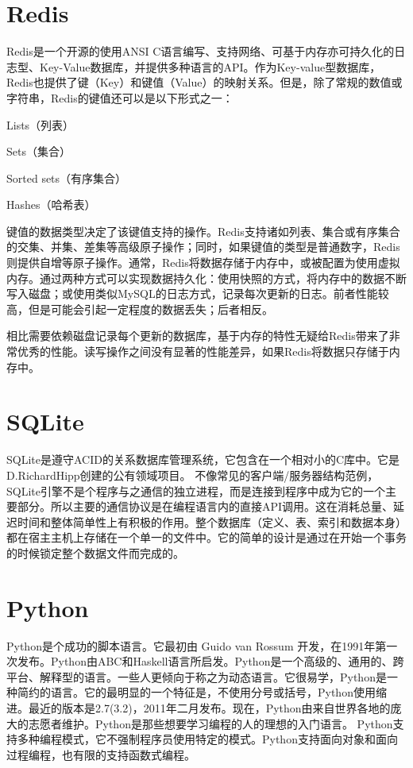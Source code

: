\documentclass{zjutthesis}
\begin{document}
\section{Redis}
Redis是一个开源的使用ANSI C语言编写、支持网络、可基于内存亦可持久化的日志型、Key-Value数据库，并提供多种语言的API。作为Key-value型数据库，Redis也提供了键（Key）和键值（Value）的映射关系。但是，除了常规的数值或字符串，Redis的键值还可以是以下形式之一：

Lists（列表）

Sets（集合）

Sorted sets（有序集合）

Hashes（哈希表）

键值的数据类型决定了该键值支持的操作。Redis支持诸如列表、集合或有序集合的交集、并集、差集等高级原子操作；同时，如果键值的类型是普通数字，Redis则提供自增等原子操作。通常，Redis将数据存储于内存中，或被配置为使用虚拟内存。通过两种方式可以实现数据持久化：使用快照的方式，将内存中的数据不断写入磁盘；或使用类似MySQL的日志方式，记录每次更新的日志。前者性能较高，但是可能会引起一定程度的数据丢失；后者相反。

相比需要依赖磁盘记录每个更新的数据库，基于内存的特性无疑给Redis带来了非常优秀的性能。读写操作之间没有显著的性能差异，如果Redis将数据只存储于内存中。


\section{SQLite}
SQLite是遵守ACID的关系数据库管理系统，它包含在一个相对小的C库中。它是D.RichardHipp创建的公有领域项目。
不像常见的客户端/服务器结构范例，SQLite引擎不是个程序与之通信的独立进程，而是连接到程序中成为它的一个主要部分。所以主要的通信协议是在编程语言内的直接API调用。这在消耗总量、延迟时间和整体简单性上有积极的作用。整个数据库（定义、表、索引和数据本身）都在宿主主机上存储在一个单一的文件中。它的简单的设计是通过在开始一个事务的时候锁定整个数据文件而完成的。

\section{Python}
Python是个成功的脚本语言。它最初由 Guido van Rossum 开发，在1991年第一次发布。Python由ABC和Haskell语言所启发。Python是一个高级的、通用的、跨平台、解释型的语言。一些人更倾向于称之为动态语言。它很易学，Python是一种简约的语言。它的最明显的一个特征是，不使用分号或括号，Python使用缩进。最近的版本是2.7(3.2)，2011年二月发布。现在，Python由来自世界各地的庞大的志愿者维护。Python是那些想要学习编程的人的理想的入门语言。
Python支持多种编程模式，它不强制程序员使用特定的模式。Python支持面向对象和面向过程编程，也有限的支持函数式编程。
\end{document}
